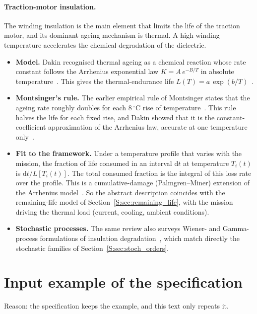 \documentclass[11pt,a4paper]{article}
\theoremstyle{plain}
\theoremstyle{definition}
\theoremstyle{remark}
\begin{document}
\paragraph{Traction-motor insulation.}
The winding insulation is the main element that limits the life of the traction motor, and its dominant ageing mechanism is thermal.
A high winding temperature accelerates the chemical degradation of the dielectric.
\begin{itemize}
  \item \textbf{Model.}
    Dakin recognised thermal ageing as a chemical reaction whose rate constant follows the Arrhenius exponential law $K = A\,e^{-B/T}$ in absolute temperature~\cite[Eq.~5]{Dakin1948}.
    This gives the thermal-endurance life $L(T) = a\,\exp(b/T)$~\cite[Eq.~1]{Zhang2025insul}.
  \item \textbf{Montsinger's rule.}
    The earlier empirical rule of Montsinger states that the ageing rate roughly doubles for each 8\,$^\circ$C rise of temperature~\cite[Synopsis, p.~776]{Montsinger1930}.
    This rule halves the life for each fixed rise, and Dakin showed that it is the constant-coefficient approximation of the Arrhenius law, accurate at one temperature only~\cite[Fig.~1 and discussion of Eq.~5]{Dakin1948}.
  \item \textbf{Fit to the framework.}
    Under a temperature profile that varies with the mission, the fraction of life consumed in an interval $\mathrm{d}t$ at temperature $T_i(t)$ is $\mathrm{d}t/L[T_i(t)]$.
    The total consumed fraction is the integral of this loss rate over the profile.
    This is a cumulative-damage (Palmgren--Miner) extension of the Arrhenius model~\cite[Eq.~2 and Fig.~10]{Zhang2025insul}.
    So the abstract description coincides with the remaining-life model of Section~\ref{S:sec:remaining_life}, with the mission driving the thermal load (current, cooling, ambient conditions).
  \item \textbf{Stochastic processes.}
    The same review also surveys Wiener- and Gamma-process formulations of insulation degradation~\cite[Sec.~5]{Zhang2025insul}, which match directly the stochastic families of Section~\ref{S:sec:stoch_orders}.
\end{itemize}

\section{Input example of the specification}

Reason: the specification keeps the example, and this text only repeats it.
\end{document}

